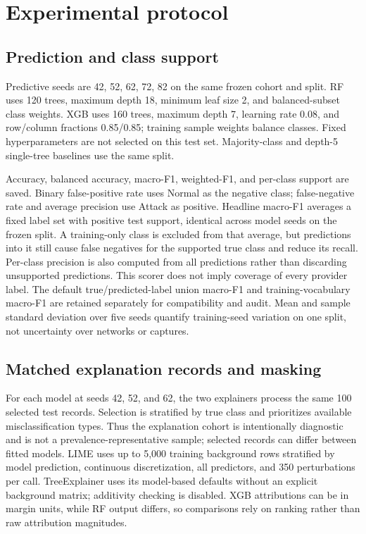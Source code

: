 \documentclass[conference,letterpaper]{IEEEtran}
\begin{document}
\section{Experimental protocol}
\subsection{Prediction and class support}
Predictive seeds are 42, 52, 62, 72, 82 on the same frozen cohort and split. RF uses 120 trees, maximum depth 18, minimum leaf size 2, and balanced-subset class weights. XGB uses 160 trees, maximum depth 7, learning rate 0.08, and row/column fractions 0.85/0.85; training sample weights balance classes. Fixed hyperparameters are not selected on this test set. Majority-class and depth-5 single-tree baselines use the same split.

Accuracy, balanced accuracy, macro-F1, weighted-F1, and per-class support are saved. Binary false-positive rate uses Normal as the negative class; false-negative rate and average precision use Attack as positive. Headline macro-F1 averages a fixed label set with positive test support, identical across model seeds on the frozen split. A training-only class is excluded from that average, but predictions into it still cause false negatives for the supported true class and reduce its recall. Per-class precision is also computed from all predictions rather than discarding unsupported predictions. This scorer does not imply coverage of every provider label. The default true/predicted-label union macro-F1 and training-vocabulary macro-F1 are retained separately for compatibility and audit. Mean and sample standard deviation over five seeds quantify training-seed variation on one split, not uncertainty over networks or captures.

\subsection{Matched explanation records and masking}
For each model at seeds 42, 52, and 62, the two explainers process the same 100 selected test records. Selection is stratified by true class and prioritizes available misclassification types. Thus the explanation cohort is intentionally diagnostic and is not a prevalence-representative sample; selected records can differ between fitted models. LIME uses up to 5,000 training background rows stratified by model prediction, continuous discretization, all predictors, and 350 perturbations per call. TreeExplainer uses its model-based defaults without an explicit background matrix; additivity checking is disabled. XGB attributions can be in margin units, while RF output differs, so comparisons rely on ranking rather than raw attribution magnitudes.
\end{document}
